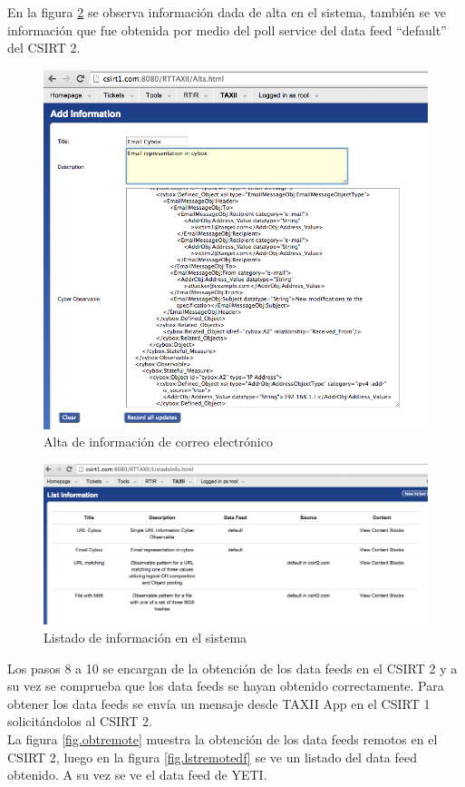 En la figura \ref{fig.lstinfo} se observa información dada de alta en el sistema, también se ve información que fue obtenida por medio del poll service del data feed “default” del CSIRT 2.

\begin{figure}[H]
	\centering
	\includegraphics[scale=0.6]{caso-de-estudio/alta.png}
	\caption{Alta de información de correo electrónico}
	\label{fig.altacorreo}
\end{figure}

\begin{figure}[H]
	\centering
	\includegraphics[scale=0.3]{caso-de-estudio/listadoInfo.png}
	\caption{Listado de información en el sistema}
	\label{fig.lstinfo}
\end{figure}

Los pasos 8 a 10 se encargan de la obtención de los data feeds en el CSIRT 2 y a su vez se comprueba que los data feeds se hayan obtenido correctamente. Para obtener los data feeds se envía un mensaje desde TAXII App en el CSIRT 1 solicitándolos al CSIRT 2. \\
La figura \ref{fig.obtremote} muestra la obtención de los data feeds remotos en el CSIRT 2, luego en la figura \ref{fig.lstremotedf} se ve un listado del data feed obtenido. A su vez se ve el data feed de YETI.

